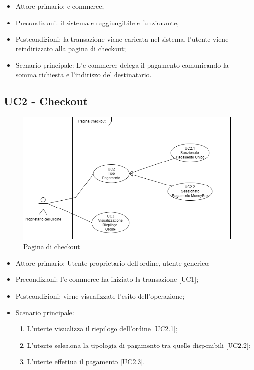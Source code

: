 \begin{itemize}
    \item Attore primario: e-commerce\glo{};
    \item Precondizioni: il sistema è raggiungibile e funzionante;
    \item Postcondizioni: la transazione viene caricata nel sistema, l'utente viene reindirizzato alla pagina di checkout;
    \item Scenario principale: L'e-commerce\glo{} delega il pagamento comunicando la somma richiesta e l'indirizzo del destinatario.
\end{itemize}

\subsection{UC2 - Checkout}\label{subsection: UC2}

\begin{figure}[H]
    \centering
    \includegraphics[scale=0.7]{immagini/UseCases-UC2-1.png}
    \caption{Pagina di checkout}
\end{figure}

\begin{itemize}
    \item Attore primario: Utente proprietario dell'ordine, utente generico;
    \item Precondizioni: l'e-commerce\glo{} ha iniziato la transazione [UC1];
    \item Postcondizioni: viene visualizzato l'esito dell'operazione;
    \item Scenario principale:
    \begin{enumerate}
        \item L'utente visualizza il riepilogo dell'ordine [UC2.1];
        \item L'utente seleziona la tipologia di pagamento tra quelle disponibili [UC2.2];
        \item L'utente effettua il pagamento [UC2.3].
    \end{enumerate}
\end{itemize}

